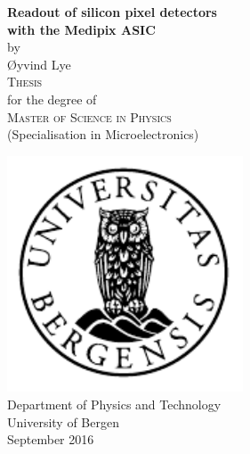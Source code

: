 \documentclass[12pt]{article}
\begin{document}
\maketitle

\newcommand{\blankpage}{\newpage{}\thispagestyle{empty}\mbox{}\newpage{}}
\newcommand{\HRule}{\rule{\linewidth}{0.5mm}}

\begin{titlepage}
\begin{center}
{ \Huge \bfseries Readout of silicon pixel detectors \\with the Medipix ASIC}\\[1cm]

\large by\\ \Large Øyvind Lye\\[1.6cm]

\textsc{\Large Thesis}\\
\large for the degree of\\
\textsc{\Large Master of Science in Physics}\\[0.5cm]
\large (Specialisation in Microelectronics) \\[0.5cm]


\end{center}
\vfill
\begin{center}
{
	\includegraphics[width=7cm]{uib-emblem-svart}\\[0.5cm]
	
	\large {Department of Physics and Technology}\\
	\large {University of Bergen}\\[1cm]
	September 2016}
\end{center}
\end{titlepage}
\end{document}
